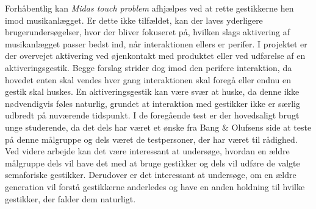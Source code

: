 %
Forhåbentlig kan \textit{Midas touch problem} afhjælpes ved at rette gestikkerne hen imod musikanlægget. Er dette ikke tilfældet, kan der laves yderligere brugerundersøgelser, hvor der bliver fokuseret på, hvilken slags aktivering af musikanlægget passer bedst ind, når interaktionen ellers er perifer. I projektet er der overvejet aktivering ved øjenkontakt med produktet eller ved udførelse af en aktiveringsgestik. Begge forslag strider dog imod den perifere interaktion, da hovedet enten skal vendes hver gang interaktionen skal foregå eller endnu en gestik skal huskes. En aktiveringsgestik kan være svær at huske, da denne ikke nødvendigvis føles naturlig, grundet at interaktion med gestikker ikke er særlig udbredt på nuværende tidspunkt. \blankline
%
I de foregående test er der hovedsaligt brugt unge studerende, da det dels har været et ønske fra Bang $\&$ Olufsens side at teste på denne målgruppe og dels været de testpersoner, der har været til rådighed. Ved videre arbejde kan det være interessant at undersøge, hvordan en ældre målgruppe dels vil have det med at bruge gestikker og dels vil udføre de valgte semaforiske gestikker. Derudover er det interessant at undersøge, om en ældre generation vil forstå gestikkerne anderledes og have en anden holdning til hvilke gestikker, der falder dem naturligt. 
